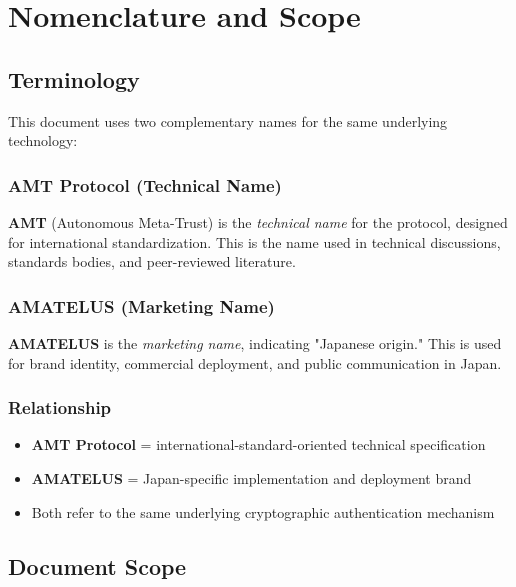 
\chapter{Nomenclature and Scope}

\section{Terminology}

This document uses two complementary names for the same underlying technology:

\subsection{AMT Protocol (Technical Name)}

\textbf{AMT} (Autonomous Meta-Trust) is the \emph{technical name} for the protocol, designed for international standardization. This is the name used in technical discussions, standards bodies, and peer-reviewed literature.

\subsection{AMATELUS (Marketing Name)}

\textbf{AMATELUS} is the \emph{marketing name}, indicating "Japanese origin." This is used for brand identity, commercial deployment, and public communication in Japan.

\subsection{Relationship}

\begin{itemize}
  \item \textbf{AMT Protocol} = international-standard-oriented technical specification
  \item \textbf{AMATELUS} = Japan-specific implementation and deployment brand
  \item Both refer to the same underlying cryptographic authentication mechanism
\end{itemize}

\section{Document Scope}

